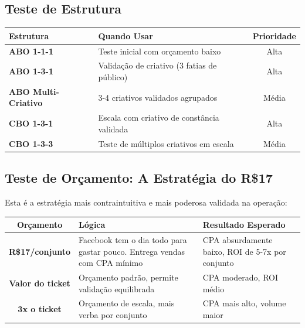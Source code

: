 \documentclass[12pt, a4paper]{article}
\begin{document}
\subsection{Teste de Estrutura}

\begin{table}[H]
    \centering
    \renewcommand{\arraystretch}{1.4}
    \begin{tabularx}{\textwidth}{X X c}
        \toprule
        \rowcolor{tableHeader} \textbf{Estrutura} & \textbf{Quando Usar} & \textbf{Prioridade} \\
        \midrule
        \textbf{ABO 1-1-1} & Teste inicial com orçamento baixo & Alta \\
        \rowcolor{lightGray}
        \textbf{ABO 1-3-1} & Validação de criativo (3 fatias de público) & Alta \\
        \textbf{ABO Multi-Criativo} & 3-4 criativos validados agrupados & Média \\
        \rowcolor{lightGray}
        \textbf{CBO 1-3-1} & Escala com criativo de constância validada & Alta \\
        \textbf{CBO 1-3-3} & Teste de múltiplos criativos em escala & Média \\
        \bottomrule
    \end{tabularx}
\end{table}

\needspace{8cm}

\subsection{Teste de Orçamento: A Estratégia do R\$17}

Esta é a estratégia mais contraintuitiva e mais poderosa validada na operação:

\begin{table}[H]
    \centering
    \renewcommand{\arraystretch}{1.5}
    \begin{tabularx}{\textwidth}{c X X}
        \toprule
        \rowcolor{tableHeader} \textbf{Orçamento} & \textbf{Lógica} & \textbf{Resultado Esperado} \\
        \midrule
        \textcolor{successGreen}{\textbf{R\$17/conjunto}} & Facebook tem o dia todo para gastar pouco. Entrega vendas com CPA mínimo & CPA absurdamente baixo, ROI de 5-7x por conjunto \\
        \rowcolor{lightGray}
        \textbf{Valor do ticket} & Orçamento padrão, permite validação equilibrada & CPA moderado, ROI médio \\
        \textbf{3x o ticket} & Orçamento de escala, mais verba por conjunto & CPA mais alto, volume maior \\
        \bottomrule
    \end{tabularx}
\end{table}
\end{document}
